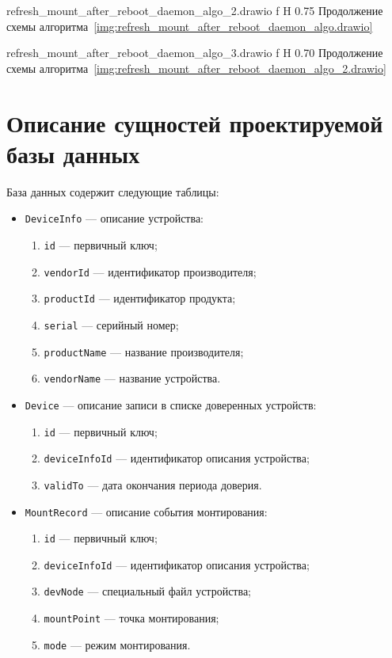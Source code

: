     {refresh_mount_after_reboot_daemon_algo_2.drawio}
    {f}
    {H}
    {0.75\textwidth}
    {Продолжение схемы алгоритма~\ref{img:refresh_mount_after_reboot_daemon_algo.drawio}}

    {refresh_mount_after_reboot_daemon_algo_3.drawio}
    {f}
    {H}
    {0.70\textwidth}
    {Продолжение схемы алгоритма~\ref{img:refresh_mount_after_reboot_daemon_algo_2.drawio}}

\section{Описание сущностей проектируемой базы данных}

База данных содержит следующие таблицы:

\begin{itemize}[label=---]
    \item \texttt{DeviceInfo} --- описание устройства:
    \begin{enumerate}
        \item \texttt{id} --- первичный ключ;
        \item \texttt{vendorId} --- идентификатор производителя;
        \item \texttt{productId} --- идентификатор продукта;
        \item \texttt{serial} --- серийный номер;
        \item \texttt{productName} --- название производителя;
        \item \texttt{vendorName} --- название устройства.
    \end{enumerate}
    \item \texttt{Device} --- описание записи в списке доверенных устройств:
    \begin{enumerate}
        \item \texttt{id} --- первичный ключ;
        \item \texttt{deviceInfoId} --- идентификатор описания устройства;
        \item \texttt{validTo} --- дата окончания периода доверия.
    \end{enumerate}
    \item \texttt{MountRecord} --- описание события монтирования:
    \begin{enumerate}
        \item \texttt{id} --- первичный ключ;
        \item \texttt{deviceInfoId} --- идентификатор описания устройства;
        \item \texttt{devNode} --- специальный файл устройства;
        \item \texttt{mountPoint} --- точка монтирования;
        \item \texttt{mode} --- режим монтирования.
    \end{enumerate}
\end{itemize}

